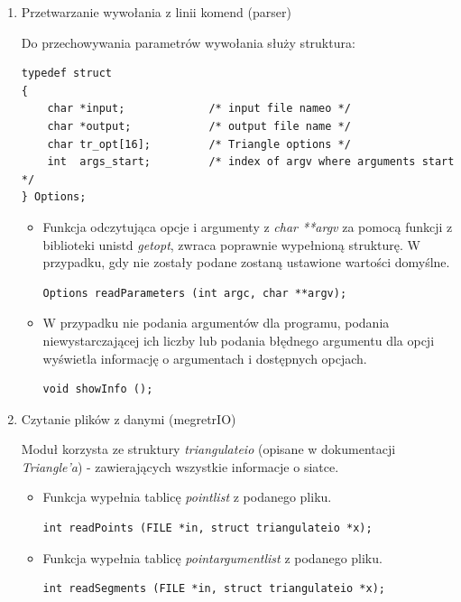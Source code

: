 \documentclass[a4paper,12pt,twoside]{article}
\begin{document}
\begin{enumerate}
\item Przetwarzanie wywołania z linii komend (parser)

Do przechowywania parametrów wywołania służy struktura:

\begin{lstlisting}
typedef struct  
{
	char *input;             /* input file nameo */
	char *output;            /* output file name */
	char tr_opt[16];         /* Triangle options */
	int  args_start;         /* index of argv where arguments start */
} Options;
\end{lstlisting}

\begin{itemize}

\item Funkcja odczytująca opcje i argumenty z \textit{char **argv} za pomocą funkcji z biblioteki unistd \textit{getopt}, zwraca poprawnie wypełnioną strukturę. W przypadku, gdy nie zostały podane zostaną ustawione wartości domyślne.

\begin{lstlisting}
Options readParameters (int argc, char **argv);
\end{lstlisting}

\item W przypadku nie podania argumentów dla programu, podania niewystarczającej ich liczby lub podania błędnego argumentu dla opcji wyświetla informację o argumentach i dostępnych opcjach.
\begin{lstlisting}
void showInfo ();
\end{lstlisting}

\end{itemize}

\item Czytanie plików z danymi (megretrIO)

Moduł korzysta ze struktury \textit{triangulateio} (opisane w dokumentacji \textit{Triangle'a}) - zawierających wszystkie informacje o siatce.

\begin{itemize}

\item Funkcja wypełnia tablicę \textit{pointlist} z podanego pliku.
\begin{lstlisting}
int readPoints (FILE *in, struct triangulateio *x); 
\end{lstlisting}

\item Funkcja wypełnia tablicę \textit{pointargumentlist} z podanego pliku.
\begin{lstlisting}
int readSegments (FILE *in, struct triangulateio *x);
\end{lstlisting}


\end{itemize}
\end{enumerate}
\end{document}
